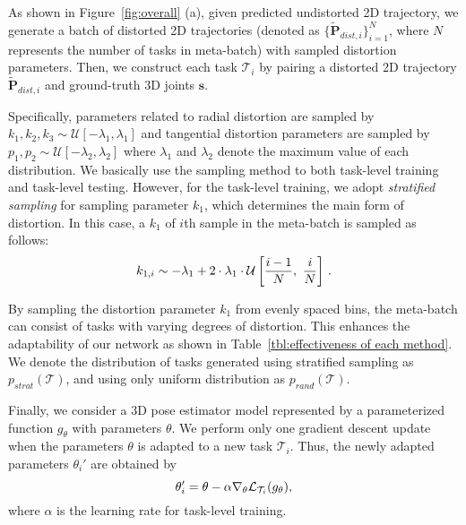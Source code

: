         As shown in Figure~\ref{fig:overall} (a), given predicted undistorted 2D trajectory, we generate a batch of distorted 2D trajectories (denoted as $\{\tilde{\mathbf{P}}_{dist,i}\}_{i=1}^N$, where $N$ represents the number of tasks in meta-batch) with sampled distortion parameters. Then, we construct each task $\mathcal{T}_i$ by pairing a distorted 2D trajectory $\tilde{\mathbf{P}}_{dist,i}$ and ground-truth 3D joints $\mathbf{s}$.
        
        Specifically, parameters related to radial distortion are sampled by $k_1,k_2,k_3 \sim \mathcal{U}[-\lambda_1,\lambda_1]$ and tangential distortion parameters are sampled by $p_1,p_2 \sim \mathcal{U}[-\lambda_2,\lambda_2]$ where $\lambda_1$ and $\lambda_2$ denote the maximum value of each distribution. We basically use the sampling method to both task-level training and task-level testing. However, for the task-level training, we adopt \textit{stratified sampling} for sampling parameter $k_1$, which determines the main form of distortion. In this case, a $k_1$ of $i$th sample in the meta-batch is sampled as follows:
        \vspace{-1mm}
        \begin{equation}
            k_{1,i} \sim -\lambda_1 + 2\cdot\lambda_1\cdot\mathcal{U}\left[ \frac{i-1}{N},\,\, \frac{i}{N} \right]\,.
            \label{eq:stratified sampling}
            \vspace{-1mm}
        \end{equation}
        
        By sampling the distortion parameter $k_1$ from evenly spaced bins, the meta-batch can consist of tasks with varying degrees of distortion. This enhances the adaptability of our network as shown in Table~\ref{tbl:effectiveness of each method}. We denote the distribution of tasks generated using stratified sampling as $p_{strat}(\mathcal{T})$, and using only uniform distribution as $p_{rand}(\mathcal{T})$.
        
        Finally, we consider a 3D pose estimator model represented by a parameterized function $g_\theta$ with parameters $\theta$. We perform only one gradient descent update when the parameters $\theta$ is adapted to a new task $\mathcal{T}_i$. Thus, the newly adapted parameters $\theta_i'$ are obtained by
        \vspace{-1mm}
        \begin{equation}
            \theta_i' = \theta - \alpha \nabla_{\theta} \mathcal{L}_{\mathcal{T}_{i}}(g_{\theta}),
            \vspace{-1mm}
        \end{equation}
        where $\alpha$ is the learning rate for task-level training.
        
